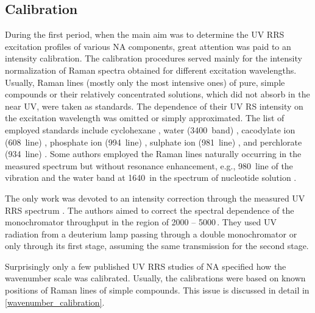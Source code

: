 \subsection{Calibration}

During the first period, when the main aim was to determine the UV RRS
excitation profiles of various NA components, great attention was paid to an
intensity calibration.
The calibration procedures served mainly for the intensity normalization of
Raman spectra obtained for different excitation wavelengths.
Usually, Raman lines (mostly only the most intensive ones) of pure, simple
compounds or their relatively concentrated solutions, which did not absorb in
the near UV, were taken as standards.
The dependence of their UV RS intensity on the excitation wavelength was
omitted or simply approximated.
The list of employed standards include cyclohexane
\parencite{Hamaguchi1974},
water (3400\,\icm{} band)
\parencite{%
	Chinsky1978,%
	Fodor1985%
},
cacodylate ion (608\,\icm{} line)
\parencite{%
	Blazej1977,%
	Samanta1982%
},
phosphate ion (994\,\icm{} line)
\parencite{Kubasek1985},
sulphate ion (981\,\icm{} line)
\parencite{%
	Perno1989,%
	Benson1992,%
	Wen1998%
},
and perchlorate (934\,\icm{} line)
\parencite{Rodgers1992}.
Some authors employed the Raman lines naturally occurring in the measured
spectrum but without resonance enhancement, e.g., 980\,\icm{} line of the
vibration and the water band at 1640\,\icm{} in the spectrum of nucleotide
solution
\parencite{Tsuboi1974}.

The only work was devoted to an intensity correction through the measured
UV RRS spectrum
\parencite{Chinsky1983a}.
The authors aimed to correct the spectral dependence of the monochromator
throughput in the region of 2000 -- 5000\,\icm.
They used UV radiation from a deuterium lamp passing through a double
monochromator or only through its first stage, assuming the same transmission
for the second stage.

Surprisingly only a few published UV RRS studies of NA specified how the
wavenumber scale was calibrated.
Usually, the calibrations were based on known positions of Raman lines of
simple compounds.
This issue is discussed in detail in
\cref{wavenumber_calibration}.
